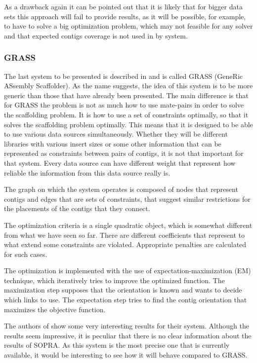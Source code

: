 \documentclass[11pt]{article}
\begin{document}
As a drawback again it can be pointed out that it is likely that for bigger data
sets this approach will fail to provide results, as it will be possible, for
example, to have to solve a big optimization problem, which may not feasible for
any solver and that expected contigs coverage is not used in by system.

\subsubsection{GRASS} %
\label{ssub:GRASS}
The last system to be presented is described in \cite{grass} and is called
GRASS (GeneRic ASsembly Scaffolder). As the name suggests, the idea of this
system is to be more generic than those that have already been presented. The
main difference is that for GRASS the problem is not as much how to use
mate-pairs in order to solve the scaffolding problem. It is how to use a set of
constraints optimally, so that it solves the scaffolding problem optimally. This
means that it is designed to be able to use various data sources simultaneously.
Whether they will be different libraries with various insert sizes or some other
information that can be represented as constraints between pairs of contigs, it
is not that important for that system. Every data source can have different
weight that represent how reliable the information from this data source really
is.

The graph on which the system operates is composed of nodes that represent
contigs and edges that are sets of constraints, that suggest similar
restrictions for the placements of the contigs that they connect.

The optimization criteria is a single quadratic object, which is somewhat
different from what we have seen so far. There are different coefficients that
represent to what extend some constraints are violated. Appropriate penalties
are calculated for such cases.

The optimization is implemented with the use of expectation-maximization (EM)
technique, which iteratively tries to improve the optimized function. The
maximization step supposes that the orientation is known and wants to decide
which links to use. The expectation step tries to find the contig orientation
that maximizes the objective function.

The authors of \cite{grass} show some very interesting results for their system.
Although the results seem impressive, it is peculiar that there is no clear
information about the results of SOPRA. As this system is the most precise one
that is currently available, it would be interesting to see how it will behave
compared to GRASS.
\end{document}
